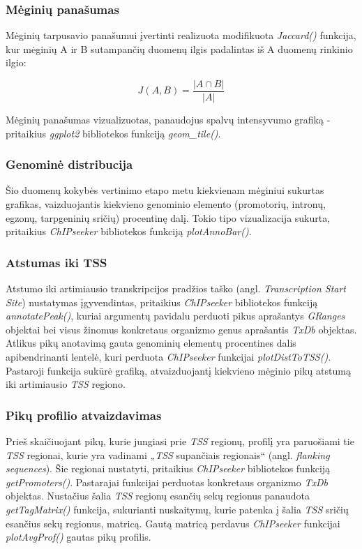 \documentclass[12pt]{article}
\begin{document}
\subsubsection*{Mėginių panašumas}
Mėginių tarpusavio panašumui įvertinti realizuota modifikuota
\emph{Jaccard()} funkcija, kur mėginių A ir B sutampančių duomenų ilgis 
padalintas iš A duomenų rinkinio ilgio:

\[ J(A, B) = \frac{|A \cap B|}{|A|} \]

Mėginių panašumas vizualizuotas, panaudojus spalvų intensyvumo grafiką -
pritaikius \emph{ggplot2} bibliotekos funkciją \emph{geom\_tile()}.

\newpage

\subsubsection*{Genominė distribucija}
Šio duomenų kokybės vertinimo etapo metu kiekvienam mėginiui sukurtas grafikas,
vaizduojantis kiekvieno genominio elemento (promotorių, intronų, egzonų,
tarpgeninių sričių) procentinę dalį. Tokio tipo vizualizacija sukurta,
pritaikius \emph{ChIPseeker} \cite{CHIPSEEKER} bibliotekos funkciją
\emph{plotAnnoBar()}.

\subsubsection*{Atstumas iki TSS}
Atstumo iki artimiausio transkripcijos pradžios taško
(angl. \emph{Transcription Start Site}) nustatymas įgyvendintas, pritaikius
\emph{ChIPseeker} bibliotekos funkciją \emph{annotatePeak()}, kuriai argumentų
pavidalu perduoti pikus aprašantys \emph{GRanges} \cite{GRANGES} objektai bei
visus žinomus konkretaus organizmo genus aprašantis \emph{TxDb} \cite{TXDB_MM}
objektas. Atlikus pikų anotavimą gauta genominių elementų procentines dalis
apibendrinanti lentelė, kuri perduota \emph{ChIPseeker} funkcijai
\emph{plotDistToTSS()}. Pastaroji funkcija sukūrė grafiką, atvaizduojantį
kiekvieno mėginio pikų atstumą iki artimiausio \emph{TSS} regiono.

\subsubsection*{Pikų profilio atvaizdavimas}
Prieš skaičiuojant pikų, kurie jungiasi prie \emph{TSS} regionų, profilį yra
paruošiami tie \emph{TSS} regionai, kurie yra vadinami „\emph{TSS}
supančiais regionais“ (angl. \emph{flanking sequences}). Šie regionai nustatyti,
pritaikius \emph{ChIPseeker} bibliotekos funkciją \emph{getPromoters()}.
Pastarajai funkcijai perduotas konkretaus organizmo \emph{TxDb} objektas.
Nustačius šalia \emph{TSS} regionų esančių sekų regionus panaudota
\emph{getTagMatrix()} funkcija, sukurianti nuskaitymų, kurie patenka į šalia
\emph{TSS} sričių esančius sekų regionus, matricą. Gautą matricą perdavus
\emph{ChIPseeker} funkcijai \emph{plotAvgProf()} gautas pikų profilis.
\end{document}
